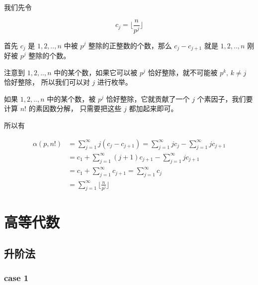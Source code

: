 \documentclass[12pt,a4paper]{ctexart}
\begin{document}
我们先令 

\[
c_j =\lfloor \frac{n}{p^j} \rfloor 
\]

首先 $c_j$ 是 $1,2,..,n$ 中被 $p^j$ 整除的正整数的个数，那么 $c_{j} - c_{j+1}$ 就是 $1,2,..,n$ 刚好被 $p^{j}$ 整除的个数。

注意到 $1,2,..,n$ 中的某个数，如果它可以被 $p^j$ 恰好整除，就不可能被 $p^{k},\, k \ne j$ 恰好整除，
所以我们可以对 $j$ 进行枚举。

如果 $1,2,..,n$ 中的某个数，被 $p^{j}$ 恰好整除，它就贡献了一个 $j$ 个素因子，我们要计算 $n!$ 的素因数分解，
只需要把这些 $j$ 都加起来即可。

所以有

\begin{align*}
\alpha(p,n!) &= \sum_{j=1}^{\infty}j(c_{j} - c_{j+1}) = \sum_{j=1}^{\infty}jc_{j} - \sum_{j=1}^{\infty}jc_{j+1} \\
    &= c_1 + \sum_{j=1}^{\infty}(j+1)c_{j+1} - \sum_{j=1}^{\infty}jc_{j+1} \\
    &= c_1 + \sum_{j=1}^{\infty}c_{j+1} = \sum_{j=1}^{\infty}c_j \\
    &= \sum_{j=1}^{\infty} \lfloor \frac{n}{p^j} \rfloor
\end{align*}

\section{高等代数}

\subsection{升阶法}

\subsubsection{case 1}
\end{document}
